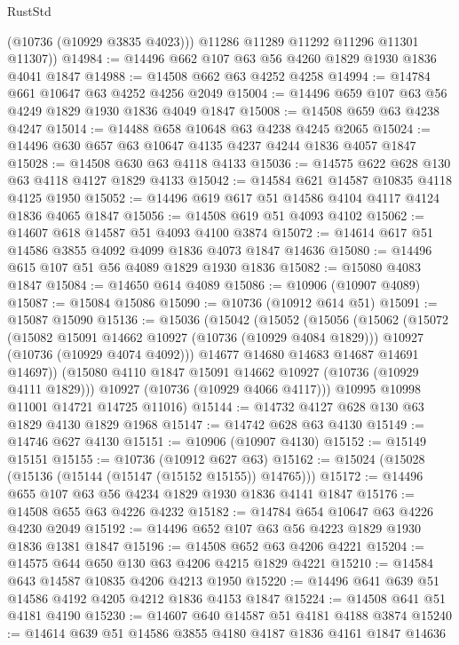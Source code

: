 \begin{lexlean}{RustStd}
\begin{coremodule}
          (@10736 (@10929 @3835 @4023)))
        @11286
        @11289
        @11292
        @11296
        @11301
        @11307))
@14984 := @14496 @662 @107 @63 @56 @4260 @1829 @1930 @1836 @4041 @1847
@14988 := @14508 @662 @63 @4252 @4258
@14994 := @14784 @661 @10647 @63 @4252 @4256 @2049
@15004 := @14496 @659 @107 @63 @56 @4249 @1829 @1930 @1836 @4049 @1847
@15008 := @14508 @659 @63 @4238 @4247
@15014 := @14488 @658 @10648 @63 @4238 @4245 @2065
@15024 := @14496 @630 @657 @63 @10647 @4135 @4237 @4244 @1836 @4057 @1847
@15028 := @14508 @630 @63 @4118 @4133
@15036 := @14575 @622 @628 @130 @63 @4118 @4127 @1829 @4133
@15042 := @14584 @621 @14587 @10835 @4118 @4125 @1950
@15052 := @14496 @619 @617 @51 @14586 @4104 @4117 @4124 @1836 @4065 @1847
@15056 := @14508 @619 @51 @4093 @4102
@15062 := @14607 @618 @14587 @51 @4093 @4100 @3874
@15072 := @14614 @617 @51 @14586 @3855 @4092 @4099 @1836 @4073 @1847 @14636
@15080 := @14496 @615 @107 @51 @56 @4089 @1829 @1930 @1836
@15082 := @15080 @4083 @1847
@15084 := @14650 @614 @4089
@15086 := @10906 (@10907 @4089)
@15087 := @15084 @15086
@15090 := @10736 (@10912 @614 @51)
@15091 := @15087 @15090
@15136 := @15036
    (@15042
      (@15052
        (@15056
          (@15062
            (@15072
              (@15082 @15091 @14662 @10927 (@10736 (@10929 @4084 @1829)))
              @10927
              (@10736 (@10929 @4074 @4092)))
            @14677
            @14680
            @14683
            @14687
            @14691
            @14697))
        (@15080 @4110 @1847 @15091 @14662 @10927 (@10736 (@10929 @4111 @1829)))
        @10927
        (@10736 (@10929 @4066 @4117)))
      @10995
      @10998
      @11001
      @14721
      @14725
      @11016)
@15144 := @14732 @4127 @628 @130 @63 @1829 @4130 @1829 @1968
@15147 := @14742 @628 @63 @4130
@15149 := @14746 @627 @4130
@15151 := @10906 (@10907 @4130)
@15152 := @15149 @15151
@15155 := @10736 (@10912 @627 @63)
@15162 := @15024 (@15028 (@15136 (@15144 (@15147 (@15152 @15155)) @14765)))
@15172 := @14496 @655 @107 @63 @56 @4234 @1829 @1930 @1836 @4141 @1847
@15176 := @14508 @655 @63 @4226 @4232
@15182 := @14784 @654 @10647 @63 @4226 @4230 @2049
@15192 := @14496 @652 @107 @63 @56 @4223 @1829 @1930 @1836 @1381 @1847
@15196 := @14508 @652 @63 @4206 @4221
@15204 := @14575 @644 @650 @130 @63 @4206 @4215 @1829 @4221
@15210 := @14584 @643 @14587 @10835 @4206 @4213 @1950
@15220 := @14496 @641 @639 @51 @14586 @4192 @4205 @4212 @1836 @4153 @1847
@15224 := @14508 @641 @51 @4181 @4190
@15230 := @14607 @640 @14587 @51 @4181 @4188 @3874
@15240 := @14614 @639 @51 @14586 @3855 @4180 @4187 @1836 @4161 @1847 @14636

\end{coremodule}
\end{lexlean}
